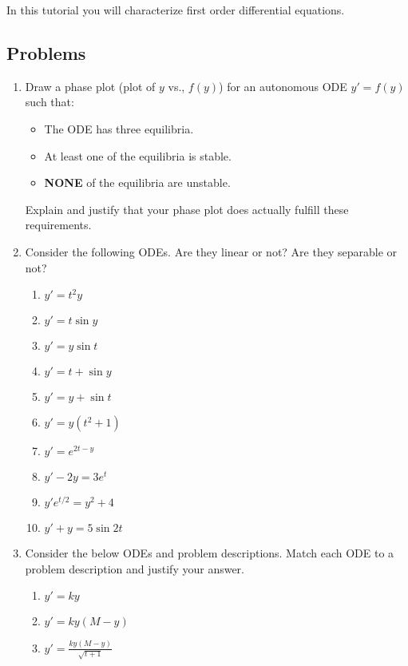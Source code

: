 \begin{objectives}
	In this tutorial you will characterize first order differential equations.
\end{objectives}

\subsection*{Problems}
\begin{enumerate}
\item Draw a phase plot (plot of $y$ vs., $f(y)$) for an autonomous ODE $y'=f(y)$ such that:
\begin{itemize}[nosep]
	\item The ODE has three equilibria.
	\item At least one of the equilibria is stable.
	\item \textbf{NONE} of the equilibria are unstable.
\end{itemize}
Explain and justify that your phase plot does actually fulfill these requirements.

\item Consider the following ODEs. Are they linear or not? Are they separable or not?
\begin{tcolorbox}[sharp corners=all,colframe=tolGrey,colback=white]
    \begin{multicols}{2}
    \begin{enumerate}[label={(\roman{enumii})},nosep,itemsep=1mm]
        \item $y'=t^2y$
        \item $y'=t\sin y$
        \item $y'=y\sin t$
        \item $y'=t+\sin y$
        \item $y'=y+\sin t$
        \item $y'=y(t^2+1)$
        \item $y'=e^{2t-y}$
        \item $y'-2y=3e^t$
        \item $y'e^{t/2}=y^2+4$
        \item $y'+y=5\sin 2t$
    \end{enumerate}
    \end{multicols}
\end{tcolorbox}

\item Consider the below ODEs and problem descriptions. Match each ODE to a problem description and justify your answer.
\begin{tcolorbox}[sharp corners=all,colframe=tolGrey,colback=white]
    \begin{multicols}{2}
    \begin{enumerate}[label={(\roman{enumii})},nosep,itemsep=1mm]
        \item $y'=ky$
        \item $y'=ky(M-y)$
        \item $y'=\frac{ky(M-y)}{\sqrt{t+1}}$
    \end{enumerate}
    \end{multicols}
\end{tcolorbox}


\end{enumerate}
